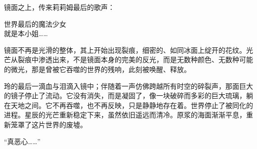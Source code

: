 镜面之上，传来莉莉姆最后的歌声：
\begin{song}
世界最后的魔法少女\\
就是本小姐……
\end{song}

镜面不再是光滑的整体，其上开始出现裂痕，细密的、如同冰面上绽开的花纹。光芒从裂痕中渗透出来，不是镜面本身的完美的反光，而是无数种颜色、无数种可能的微光，那是曾被它吞噬的世界的残响，此刻被唤醒、释放。

玲的最后一滴血与泪滴入镜中；伴随着一声仿佛跨越所有时空的碎裂声，那面巨大的镜子停止了流动。它没有消失，而是凝固了，像一块破碎而多彩的巨大琉璃，躺在天地之间。它不再吞噬，也不再反映，只是静静地存在着。世界停止了被同化的进程。星辰的光芒重新稳定下来，虽然依旧遥远而清冷。原浆的海面渐渐平息，重新笼罩了这片世界的废墟。

“真恶心……”
